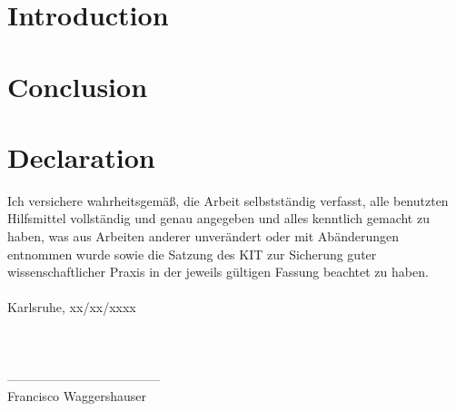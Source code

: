 \documentclass[paper=a4, fontsize=11pt, toc=listof, toc=bib, open=right, onehalfspacing, titlepage=firstiscover, headings=normal]{scrbook}
\theoremstyle{definition} %
\begin{document}
	
	
	
	\tableofcontents %
	\listoftables %
	\listoffigures %
	
	
	
	\mainmatter 
	\doublespacing %
	
	\chapter{Introduction}
	
	
	\chapter{Conclusion}
	
	
	
	\printbibliography
	\cleardoublepage %
	
	
	
	\chapter*{Declaration}
	Ich  versichere  wahrheitsgemäß,  die  Arbeit selbstständig  verfasst,  alle  benutzten  Hilfsmittel  voll\-ständig  und  genau  angegeben  und  alles kenntlich  gemacht  zu  haben,  was  aus  Arbeiten  anderer  unverändert  oder  mit  Abänderungen entnommen  wurde  sowie die Satzung  des  KIT  zur  Sicherung guter wissenschaftlicher Praxis in der jeweils gültigen Fassung beachtet zu haben.\\ \\
	\noindent Karlsruhe,  xx/xx/xxxx
	\\ \\ \\ \\
	------------------------------------\\
	Francisco Waggershauser
	
	
	
	
\end{document}
